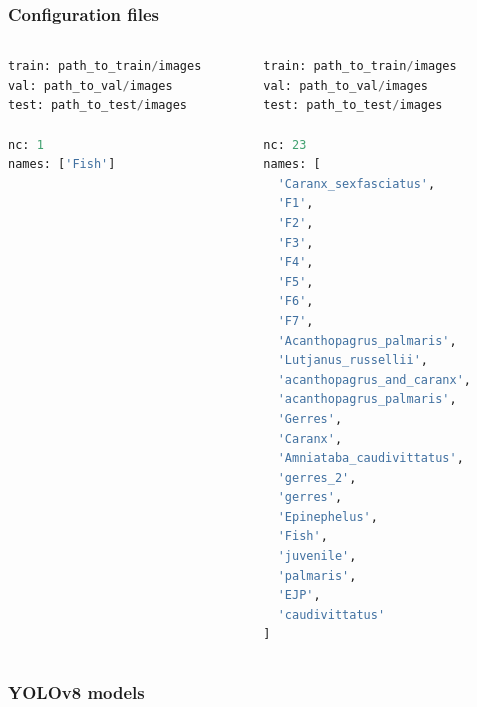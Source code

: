 \documentclass[serif]{beamer}  %
\begin{document}
\begin{frame}[fragile]
\frametitle{Configuration files}
\begin{columns}
\begin{column}{0.45\textwidth}
\begin{lstlisting}[language=python]
train: path_to_train/images
val: path_to_val/images
test: path_to_test/images

nc: 1
names: ['Fish']
\end{lstlisting}
\end{column}

\begin{column}{0.45\textwidth}
\begin{lstlisting}[language=python]
train: path_to_train/images
val: path_to_val/images
test: path_to_test/images

nc: 23
names: [
  'Caranx_sexfasciatus',
  'F1', 
  'F2',
  'F3', 
  'F4',
  'F5',
  'F6',
  'F7',
  'Acanthopagrus_palmaris',
  'Lutjanus_russellii',
  'acanthopagrus_and_caranx',
  'acanthopagrus_palmaris', 
  'Gerres',
  'Caranx',
  'Amniataba_caudivittatus',
  'gerres_2',
  'gerres',
  'Epinephelus',
  'Fish',
  'juvenile',
  'palmaris',
  'EJP',
  'caudivittatus'
]
\end{lstlisting}
\end{column}
\end{columns}
\end{frame}

\begin{frame}
\frametitle{YOLOv8 models}
\begin{center}
\end{center}
\end{frame}
\end{document}
